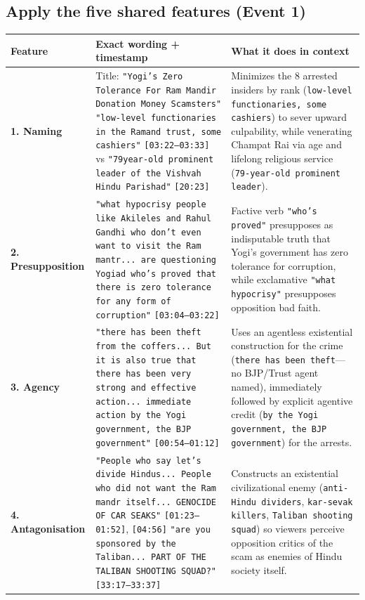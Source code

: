 \documentclass[10pt,a4paper]{article}
\begin{document}
\subsection*{Apply the five shared features (Event 1)}
\begin{longtable}{@{}>{\raggedright\arraybackslash}p{} >{\raggedright\arraybackslash}p{} >{\raggedright\arraybackslash}p{}@{}}
\toprule
\textbf{Feature} & \textbf{Exact wording + timestamp} & \textbf{What it does in context} \\
\midrule
\endhead
\textbf{1. Naming} & Title: \texttt{"Yogi's Zero Tolerance For Ram Mandir Donation Money Scamsters"} \newline  \texttt{"low-level functionaries in the Ramand trust, some cashiers"} \texttt{[03:22--03:33]} vs \texttt{"79year-old prominent leader of the Vishvah Hindu Parishad"} \texttt{[20:23]} & Minimizes the 8 arrested insiders by rank (\texttt{low-level functionaries, some cashiers}) to sever upward culpability, while venerating Champat Rai via age and lifelong religious service (\texttt{79-year-old prominent leader}). \\
\addlinespace[4pt]
\textbf{2. Presupposition} & \texttt{"what hypocrisy people like Akileles and Rahul Gandhi who don't even want to visit the Ram mantr... are questioning Yogiad who's proved that there is zero tolerance for any form of corruption"} \texttt{[03:04--03:22]} & Factive verb \texttt{"who's proved"} presupposes as indisputable truth that Yogi's government has zero tolerance for corruption, while exclamative \texttt{"what hypocrisy"} presupposes opposition bad faith. \\
\addlinespace[4pt]
\textbf{3. Agency} & \texttt{"there has been theft from the coffers... But it is also true that there has been very strong and effective action... immediate action by the Yogi government, the BJP government"} \texttt{[00:54--01:12]} & Uses an agentless existential construction for the crime (\texttt{there has been theft}---no BJP/Trust agent named), immediately followed by explicit agentive credit (\texttt{by the Yogi government, the BJP government}) for the arrests. \\
\addlinespace[4pt]
\textbf{4. Antagonisation} & \texttt{"People who say let's divide Hindus... People who did not want the Ram mandr itself... GENOCIDE OF CAR SEAKS"} \texttt{[01:23--01:52]}, \texttt{[04:56]} \newline  \texttt{"are you sponsored by the Taliban... PART OF THE TALIBAN SHOOTING SQUAD?"} \texttt{[33:17--33:37]} & Constructs an existential civilizational enemy (\texttt{anti-Hindu dividers}, \texttt{kar-sevak killers}, \texttt{Taliban shooting squad}) so viewers perceive opposition critics of the scam as enemies of Hindu society itself. \\

\end{longtable}
\end{document}
